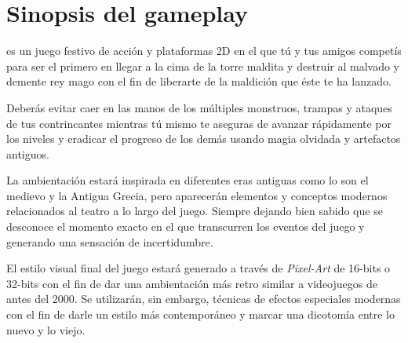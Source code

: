 \section{Sinopsis del gameplay}%



\emph{\izenburua } es un juego festivo de acción y plataformas 2D en el que tú y
tus amigos competís para ser el primero en llegar a la cima de la torre maldita
y destruir al malvado y demente rey mago con el fin de liberarte de la maldición
que éste te ha lanzado.




Deberás evitar caer en las manos de los múltiples monstruos, trampas y ataques
de tus contrincantes mientras tú mismo te aseguras de avanzar rápidamente por
los niveles y eradicar el progreso de los demás usando magia olvidada y
artefactos antiguos.


La ambientación estará inspirada en diferentes eras antiguas como lo son el
medievo y la Antigua Grecia, pero aparecerán elementos y conceptos modernos
relacionados al teatro a lo largo del juego. Siempre dejando bien sabido que se
desconoce el momento exacto en el que transcurren los eventos del juego y
generando una sensación de incertidumbre.


El estilo visual final del juego estará generado a través de \emph{Pixel-Art} de
16-bits o 32-bits con el fin de dar una ambientación más retro similar a
videojuegos de antes del 2000. Se utilizarán, sin embargo, técnicas de efectos
especiales modernas con el fin de darle un estilo más contemporáneo y marcar una
dicotomía entre lo nuevo y lo viejo.